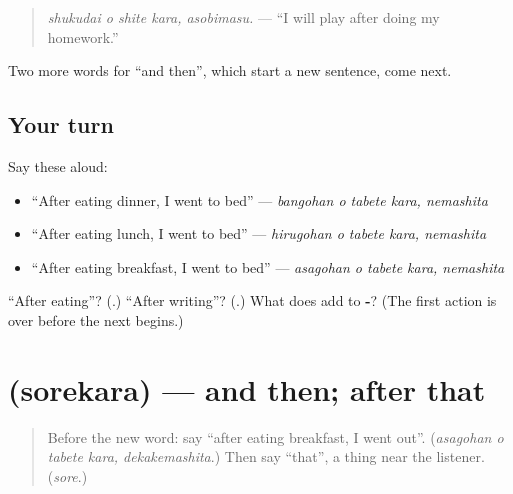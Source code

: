 \begin{quote}
\emph{shukudai o shite kara, asobimasu.} — \textquotedblleft{}I will play after doing my homework.\textquotedblright{}
\end{quote}

Two more words for \textquotedblleft{}and then\textquotedblright{}, which start a new sentence, come next.

\subsection*{Your turn}
Say these aloud:

\begin{itemize}
\raggedright
  \item \textquotedblleft{}After eating dinner, I went to bed\textquotedblright{} — \emph{bangohan o tabete kara, nemashita}
  \item \textquotedblleft{}After eating lunch, I went to bed\textquotedblright{} — \emph{hirugohan o tabete kara, nemashita}
  \item \textquotedblleft{}After eating breakfast, I went to bed\textquotedblright{} — \emph{asagohan o tabete kara, nemashita}
\end{itemize}

\begin{tcolorbox}[breakable,colback=teal!4,colframe=teal!35!black,title={Before you move on}]
\textquotedblleft{}After eating\textquotedblright{}? (\textbf{}.) \textquotedblleft{}After writing\textquotedblright{}? (\textbf{}.) What does \textbf{} add to \textbf{-}? (The first action is over before the next begins.)
\end{tcolorbox}
\section[\texorpdfstring{\ja{それから} (sorekara)}{それから (sorekara)}]{ (sorekara) — and then; after that}

\label{lesson:JA-C252-sorekara}



\begin{quote}
Before the new word: say \textquotedblleft{}after eating breakfast, I went out\textquotedblright{}. (\emph{asagohan o tabete kara, dekakemashita}.) Then say \textquotedblleft{}that\textquotedblright{}, a thing near the listener. (\emph{sore}.)
\end{quote}

